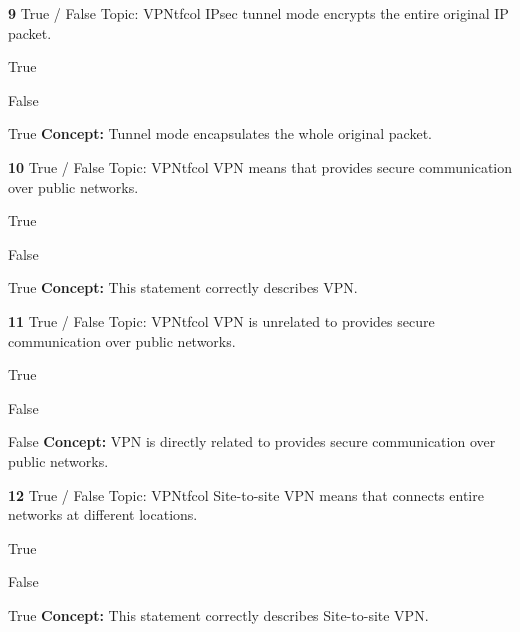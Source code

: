 \documentclass[10pt,a4paper]{article}
\begin{document}
\begin{qcard}{\color{white}\textbf{9} \hfill \small True / False \textbar{} Topic: VPN}{tfcol}
IPsec tunnel mode encrypts the entire original IP packet.

\begin{qoptions}
\item True
\item False
\end{qoptions}
\begin{explainbox}{True}
\textbf{Concept:} Tunnel mode encapsulates the whole original packet.
\end{explainbox}
\end{qcard}

\begin{qcard}{\color{white}\textbf{10} \hfill \small True / False \textbar{} Topic: VPN}{tfcol}
VPN means that provides secure communication over public networks.

\begin{qoptions}
\item True
\item False
\end{qoptions}
\begin{explainbox}{True}
\textbf{Concept:} This statement correctly describes VPN.
\end{explainbox}
\end{qcard}

\begin{qcard}{\color{white}\textbf{11} \hfill \small True / False \textbar{} Topic: VPN}{tfcol}
VPN is unrelated to provides secure communication over public networks.

\begin{qoptions}
\item True
\item False
\end{qoptions}
\begin{explainbox}{False}
\textbf{Concept:} VPN is directly related to provides secure communication over public networks.
\end{explainbox}
\end{qcard}

\begin{qcard}{\color{white}\textbf{12} \hfill \small True / False \textbar{} Topic: VPN}{tfcol}
Site-to-site VPN means that connects entire networks at different locations.

\begin{qoptions}
\item True
\item False
\end{qoptions}
\begin{explainbox}{True}
\textbf{Concept:} This statement correctly describes Site-to-site VPN.
\end{explainbox}
\end{qcard}
\end{document}
